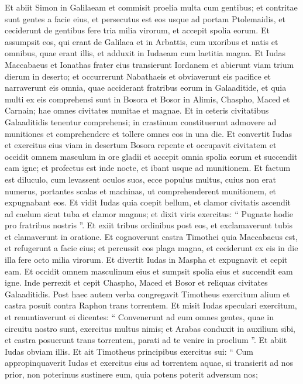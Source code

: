 \begin{biblechapter}
\begin{biblechapter}
\begin{biblechapter}
\begin{biblechapter}
\begin{biblechapter}
 \verse Et abiit Simon in Galilaeam et commisit proelia multa cum gentibus; et contritae sunt gentes a facie eius, 
\verse et persecutus est eos usque ad portam Ptolemaidis, et ceciderunt de gentibus fere tria milia virorum, et accepit spolia eorum. 
\verse Et assumpsit eos, qui erant de Galilaea et in Arbattis, cum uxoribus et natis et omnibus, quae erant illis, et adduxit in Iudaeam cum laetitia magna.
 \verse Et Iudas Maccabaeus et Ionathas frater eius transierunt Iordanem et abierunt viam trium dierum in deserto; 
\verse et occurrerunt Nabathaeis et obviaverunt eis pacifice et narraverunt eis omnia, quae acciderant fratribus eorum in Galaaditide, 
\verse et quia multi ex eis comprehensi sunt in Bosora et Bosor in Alimis, Chaspho, Maced et Carnain; hae omnes civitates munitae et magnae. 
\verse Et in ceteris civitatibus Galaaditidis tenentur comprehensi; in crastinum constituerunt admovere ad munitiones et comprehendere et tollere omnes eos in una die. 
\verse Et convertit Iudas et exercitus eius viam in desertum Bosora repente et occupavit civitatem et occidit omnem masculum in ore gladii et accepit omnia spolia eorum et succendit eam igne; 
\verse et profectus est inde nocte, et ibant usque ad munitionem. 
\verse Et factum est diluculo, cum levassent oculos suos, ecce populus multus, cuius non erat numerus, portantes scalas et machinas, ut comprehenderent munitionem, et expugnabant eos. 
\verse Et vidit Iudas quia coepit bellum, et clamor civitatis ascendit ad caelum sicut tuba et clamor magnus; 
\verse et dixit viris exercitus: “ Pugnate hodie pro fratribus nostris ”. 
\verse Et exiit tribus ordinibus post eos, et exclamaverunt tubis et clamaverunt in oratione. 
\verse Et cognoverunt castra Timothei quia Maccabaeus est, et refugerunt a facie eius; et percussit eos plaga magna, et ceciderunt ex eis in die illa fere octo milia virorum. 
\verse Et divertit Iudas in Maspha et expugnavit et cepit eam. Et occidit omnem masculinum eius et sumpsit spolia eius et succendit eam igne. 
\verse Inde perrexit et cepit Chaspho, Maced et Bosor et reliquas civitates Galaaditidis. 
\verse Post haec autem verba congregavit Timotheus exercitum alium et castra posuit contra Raphon trans torrentem. 
\verse Et misit Iudas speculari exercitum, et renuntiaverunt ei dicentes: “ Convenerunt ad eum omnes gentes, quae in circuitu nostro sunt, exercitus multus nimis; 
\verse et Arabas conduxit in auxilium sibi, et castra posuerunt trans torrentem, parati ad te venire in proelium ”. Et abiit Iudas obviam illis. 
\verse Et ait Timotheus principibus exercitus sui: “ Cum appropinquaverit Iudas et exercitus eius ad torrentem aquae, si transierit ad nos prior, non poterimus sustinere eum, quia potens poterit adversum nos; 

\end{biblechapter}
\end{biblechapter}
\end{biblechapter}
\end{biblechapter}
\end{biblechapter}
